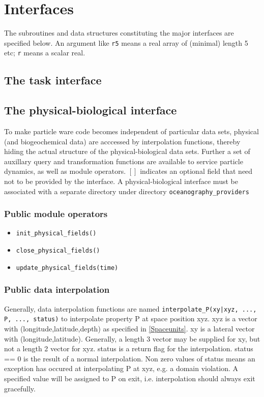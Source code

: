\chapter{Interfaces}

The subroutines and data structures constituting the major
interfaces are specified below. An argument like {\tt r5} means
a real array of (minimal) length 5 etc; {\tt r} means a scalar real.

\section{The task interface}

\section{The physical-biological interface}

To make particle ware code becomes independent of particular 
data sets, physical (and biogeochemical data) are acccessed by 
interpolation functions, thereby hiding the actual structure
of the physical-biological data sets. Further a set of auxillary 
query and transformation functions are available to service particle dynamics,
as well as module operators. $[]$ indicates an optional field
that need not to be provided by the interface. A physical-biological interface
must be associated with a separate directory under directory {\tt oceanography\_providers}

\subsection{Public module operators}

\begin{itemize}
  \item {\tt init\_physical\_fields()}
  \item {\tt close\_physical\_fields()}
  \item {\tt update\_physical\_fields(time)}
\end{itemize}

\subsection{Public data interpolation}

Generally, data interpolation functions are named 
{\tt interpolate\_P(xy|xyz, ..., P, ..., status)} to interpolate property P
at space position xyz. xyz is a vector with (longitude,latitude,depth)
as specified in \ref{Spaceunits}. xy is a lateral vector 
with (longitude,latitude). Generally, a length 3 vector may be supplied for 
xy, but not a length 2 vector for xyz.
status is a return flag for the interpolation. status == 0 is the 
result of a normal interpolation. Non zero values of status means an exception
has occured at interpolating P at xyz, e.g. a domain violation. A specified value 
will be assigned to P on exit, i.e. interpolation should always exit gracefully.

